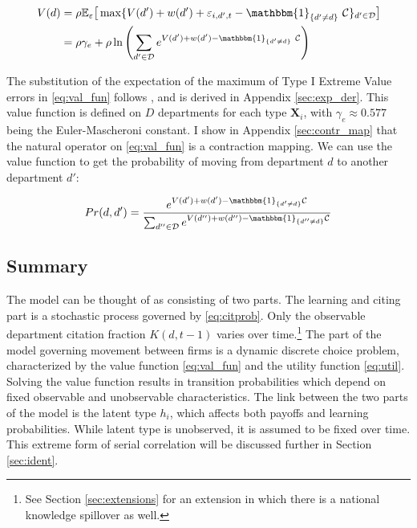 \documentclass[]{article}
\begin{document}
\begin{align}
    V(d) &= \rho \mathbb{E}_\varepsilon \big[\max\{V(d') + w(d') + \varepsilon_{i,d',t} - \mathbbm{1}_{\{d'\neq d\}} \ \mathcal{C}\}_{d'\in \mathcal{D}}\big] \nonumber \\
    &= \rho \gamma_e + \rho \ln\left( \sum_{d' \in \mathcal{D}} e^{V(d') + w(d') - \mathbbm{1}_{\{d'\neq d\}} \ \mathcal{C}} \right)
    \label{eq:val_fun}
\end{align}

The substitution of the expectation of the maximum of Type I Extreme Value errors
in \eqref{eq:val_fun} follows \citet{rust1987optimal}, and is derived in Appendix \ref{sec:exp_der}. This value function
 is defined on $D$ departments for each type $\mathbf{X}_i$, with $\gamma_e \approx 0.577$ being the Euler-Mascheroni constant. I
show in Appendix \ref{sec:contr_map} that the natural operator on \eqref{eq:val_fun} is a
contraction mapping. We can use the value function to get the
probability of moving from department $d$ to another department $d'$:

\begin{equation}
    Pr(d,d') = \frac{e^{V(d') + w(d') - \mathbbm{1}_{\{d'\neq d\}}\mathcal{C}}}{\sum_{d'' \in \mathcal{D}} e^{V(d'') + w(d'') - \mathbbm{1}_{\{d''\neq d\}} \mathcal{C}}}
    \label{eq:trans}
\end{equation}

\subsection{Summary} 

The model can be thought of as consisting of two parts.  The learning and citing part is 
a stochastic process governed by \eqref{eq:citprob}.  Only the observable department 
citation fraction $K(d,t-1)$ varies over time.\footnote{See Section \ref{sec:extensions} for an extension 
in which there is a national knowledge spillover as well.}
The part of the model governing movement between firms is a dynamic discrete
choice problem, characterized by the value
function \eqref{eq:val_fun} and the utility function \eqref{eq:util}.
 Solving the value function results in transition probabilities
 which depend on fixed observable and unobservable characteristics.  The link between the two parts
 of the model is the latent type $h_i$, which affects both
payoffs and learning probabilities.  While latent type is unobserved, it is assumed
to be fixed over time.  This extreme form of serial correlation
 will be discussed further in Section \ref{sec:ident}.
\end{document}
